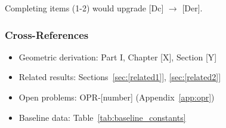 Completing items (1-2) would upgrade [Dc] $\to$ [Der].


\subsubsection{Cross-References}

\begin{itemize}
\item Geometric derivation: Part I, Chapter [X], Section [Y]
\item Related results: Sections~\ref{sec:[related1]}, \ref{sec:[related2]}
\item Open problems: OPR-[number] (Appendix~\ref{app:opr})
\item Baseline data: Table~\ref{tab:baseline_constants}
\end{itemize}


